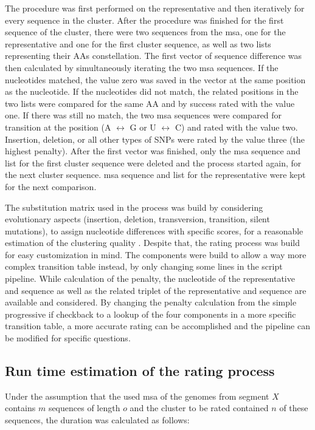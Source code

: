     The procedure was first performed on the representative and then iteratively for every sequence in the cluster. After the procedure was finished for the first sequence of the cluster, there were two sequences from the \gls{msa}, one for the representative and one for the first cluster sequence, as well as two lists representing their \glspl{AA} constellation. The first vector of sequence difference was then calculated by simultaneously iterating the two \gls{msa} sequences. If the nucleotides matched, the value zero was saved in the vector at the same position as the nucleotide. If the nucleotides did not match, the related positions in the two lists were compared for the same \gls{AA} and by success rated with the value one. If there was still no match, the two \gls{msa} sequences were compared for transition at the position (A $\leftrightarrow$ G or U $\leftrightarrow$ C) and rated with the value two. Insertion, deletion, or all other types of \glspl{SNP} were rated by the value three (the highest penalty). After the first vector was finished, only the \gls{msa} sequence and list for the first cluster sequence were deleted and the process started again, for the next cluster sequence. \Gls{msa} sequence and list for the representative were kept for the next comparison. 
    
    The substitution matrix used in the process was build by considering evolutionary aspects (insertion, deletion, transversion, transition, silent mutations), to assign nucleotide differences with specific scores, for a reasonable estimation of the clustering quality \autocite{matrix}. Despite that, the rating process was build for easy customization in mind. The components were build to allow a way more complex transition table instead, by only changing some lines in the script pipeline. While calculation of the penalty, the nucleotide of the representative and sequence as well as the related triplet of the representative and sequence are available and considered. By changing the penalty calculation from the simple progressive if checkback to a lookup of the four components in a more specific transition table, a more accurate rating can be accomplished and the pipeline can be modified for specific questions. 
    
    \subsection{Run time estimation of the rating process}
    
    Under the assumption that the used \gls{msa} of the genomes from segment $X$ contains $m$ sequences of length $o$ and the cluster to be rated contained $n$ of these sequences, the duration was calculated as follows:

